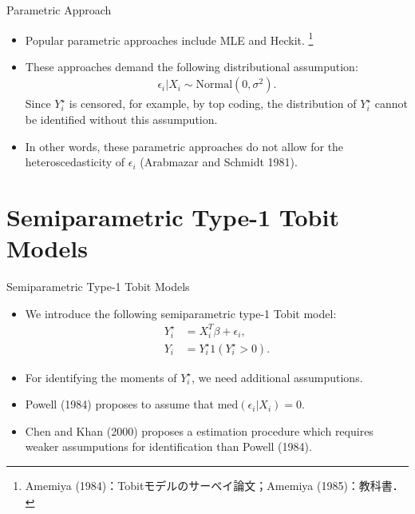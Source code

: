 \documentclass[xcolor=svgnames,dvipdfmx,cjk]{beamer}
\theoremstyle{example}
\def\med{\text{med}}
\begin{document}
\begin{frame}{Parametric Approach}
      \begin{itemize}
            \item Popular parametric approaches include MLE and Heckit.
                  \footnote{Amemiya (1984)：Tobitモデルのサーベイ論文；Amemiya (1985)：教科書．}  
            \item These approaches demand the following distributional assumpution:
                  \begin{align*}
                        \epsilon_i | X_i \sim \text{Normal}(0, \sigma^2).
                  \end{align*}
                  Since $Y_i^{\star}$ is censored, for example, by top coding, 
                  the distribution of $Y_i^{\star}$ cannot be identified 
                  without this assumpution.
            \item In other words, these parametric approaches do not allow for the heteroscedasticity of $\epsilon_i$
                  (Arabmazar and Schmidt 1981).
      \end{itemize}  
\end{frame}

\section{Semiparametric Type-1 Tobit Models}

\begin{frame}{Semiparametric Type-1 Tobit Models}
      \begin{itemize}
            \item We introduce the following semiparametric type-1 Tobit model:
                  \begin{align*}
                        Y_i^{\star} &= X_i^T \beta + \epsilon_i, \\
                        Y_i         &=  Y_i^{\star} 1( Y_i^{\star} > 0).
                  \end{align*}
            \item For identifying the moments of $Y_i^{\star}$, 
                  we need additional assumputions.
            \item Powell (1984) proposes to assume that 
                  $\med(\epsilon_i|X_i) = 0$.
            \item Chen and Khan (2000) proposes a estimation procedure 
                  which requires weaker assumputions for identification than Powell (1984).
      \end{itemize}
\end{frame}
\end{document}

